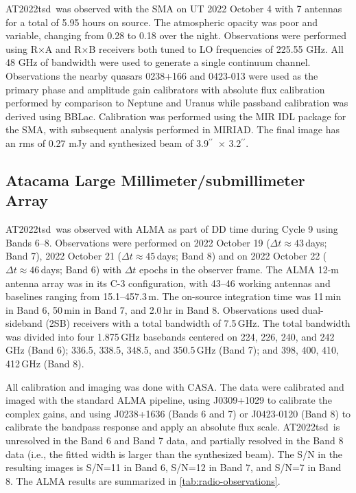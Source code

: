 \documentclass{nature_plusfigure}
\newcommand{\at}{AT2022tsd}
\newcommand{\arcsec}{$^{\prime\prime}$}
\begin{document}
\begin{methods}
\at\ was observed with the SMA on UT 2022 October 4 with 7 antennas for a total of 5.95 hours on source. The atmospheric opacity was poor and variable, changing from 0.28 to 0.18 over the night. Observations were performed using R$\times$A and R$\times$B receivers both tuned to LO frequencies of 225.55 GHz. All 48 GHz of bandwidth were used to generate a single continuum channel. Observations the nearby quasars 0238+166 and 0423-013 were used as the primary phase and amplitude gain calibrators with absolute flux calibration performed by comparison to Neptune and Uranus while passband calibration was derived using BBLac. Calibration was performed using the MIR IDL package for the SMA, with subsequent analysis performed in MIRIAD. The final image has an rms of 0.27 mJy and synthesized beam of 3.9\arcsec\ $\times$ 3.2\arcsec.

\subsection{Atacama Large Millimeter/submillimeter Array}
\label{sec:ALMA}

\at\ was observed with ALMA as part of DD time during Cycle 9 using Bands 6--8. Observations were performed on 2022 October 19 ($\Delta t \approx 43$\,days; Band 7), 2022 October 21 ($\Delta t \approx 45$\,days; Band 8) and on 2022 October 22 ($\Delta t \approx 46$\,days; Band 6) with $\Delta t$ epochs in the observer frame. The ALMA 12-m antenna array was in its C-3 configuration, with
43--46 working antennas and baselines ranging from 15.1--457.3\,m. The on-source integration time was
11\,min in Band 6, 50\,min in Band 7, and 2.0\,hr in Band 8.
Observations used dual-sideband (2SB) receivers with a total bandwidth of 7.5\,GHz. The total bandwidth was divided into four 1.875\,GHz basebands centered on 224, 226, 240, and 242\,GHz (Band 6);
336.5, 338.5, 348.5, and 350.5\,GHz (Band 7);
and 398, 400, 410, 412\,GHz (Band 8).


All calibration and imaging was done with CASA.
The data were calibrated and imaged
with the standard ALMA pipeline, using J0309+1029 to calibrate the complex gains, and using J0238+1636 (Bands 6 and 7) or J0423-0120 (Band 8) to calibrate the bandpass response and apply an absolute flux scale.
\at\ is unresolved in the Band 6 and Band 7 data, and partially resolved in the Band 8 data (i.e., the fitted width is larger than the synthesized beam).
The S/N in the resulting images is S/N=11 in Band 6, S/N=12 in Band 7, and S/N=7 in Band 8.
The ALMA results are summarized in \ref{tab:radio-observations}.


\end{methods}
\end{document}
